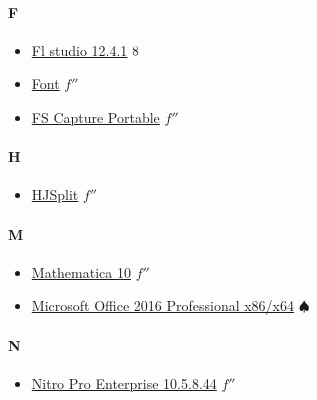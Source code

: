	\paragraph{F} \hypertarget{UF}{}
		\begin{itemize}
			\item \href{https://mega.nz/#!zyZmHa6T!TFSrrDP_85WJxsI9xLhTxzH2HNODn8uWh-hay_OvPHY} {Fl studio 12.4.1} $\oldstylenums{8}$ \\	
			\item \href{https://mega.nz/#!Xap2nS7I!aaOVHTi8JqMfcan5kzrbYOIMpgMc0ISZMrI3QCXCKn8} {Font} $f''$ \\	
			\item \href{https://mega.nz/#!zegR0axI!_ZTGRKLeikT6DLoIQuIMwTcPRIAhbCXra1SZmDWk4FU} {FS Capture Portable} $f''$ \\	
			
		\end{itemize}
	
	\paragraph{H} \hypertarget{UH}{}
		\begin{itemize}
			\item \href{https://mega.nz/#!yToQTKpK!FLcjl54WmlnKLTlQC5Mfybt-r0Wt2gXhHnwKI3t-s_U} {HJSplit} $f''$ \\	
			
		\end{itemize}
	
	\paragraph{M} \hypertarget{UM}{}
		\begin{itemize}
			\item \href{https://mega.nz/#!yOIHQYDD!DM5s6c6Cq01KdFlkKVHRn-s8BqULtmOUgHphDiv_G4Y} {Mathematica 10} $f''$ \\	
			\item \href{https://mega.nz/#!jKhiGLzB!Ntzif0FF_CQd7yAszqUJ1x6NcaXHyX0ZiIDP66CAftE} {Microsoft Office 2016 Professional x86/x64} $\spadesuit$ \\		
			
		\end{itemize}
	
	\paragraph{N} \hypertarget{UN}{}
		\begin{itemize}
			\item \href{https://mega.nz/#!DPAg3JoT!BjYCG_8WfSutYlpblaf4IbORWKLPDgIAHa4wb-TjrGo} {Nitro Pro Enterprise 10.5.8.44} $f''$ \\	
		
		\end{itemize}
	
